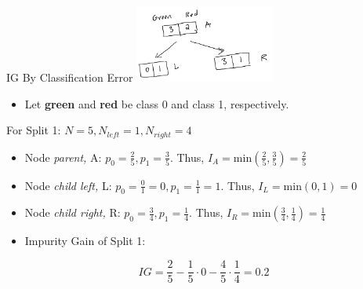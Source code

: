 \documentclass[
  ignorenonframetext,
]{beamer}
\providecommand{\tightlist}{%
  \setlength{\itemsep}{0pt}\setlength{\parskip}{0pt}}\usepackage{longtable,booktabs,array}
\begin{document}
\begin{frame}{IG By Classification Error}
\label{ig-by-classification-error}
\includegraphics[width=\textwidth,height=1in]{images/im1.png}

\begin{itemize}
\tightlist
\item
  Let \textbf{green} and \textbf{red} be class 0 and class 1,
  respectively.
\end{itemize}

For Split 1: \(N = 5, N_{left} =1, N_{right} = 4\)

\begin{itemize}
\item
  Node \emph{parent,} A: \(p_0 = \frac{2}{5}, p_1 = \frac{3}{5}\). Thus,
  \(I_{A} = \text{min}(\frac{2}{5}, \frac{3}{5}) = \frac{2}{5}\)
\item
  Node \emph{child left,} L:
  \(p_0 = \frac{0}{1} = 0, p_1 = \frac{1}{1} = 1\). Thus,
  \(I_{L} = \text{min}(0, 1) = 0\)
\item
  Node \emph{child right,} R: \(p_0 = \frac{3}{4}, p_1 = \frac{1}{4}\).
  Thus, \(I_{R} = \text{min}(\frac{3}{4}, \frac{1}{4}) = \frac{1}{4}\)
\item
  Impurity Gain of Split 1:
\end{itemize}

\[IG = \frac{2}{5} - \frac{1}{5} \cdot 0-\frac{4}{5} \cdot \frac{1}{4} = 0.2\]
\end{frame}
\end{document}
